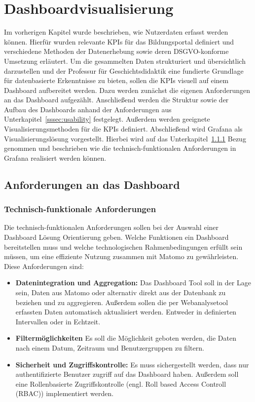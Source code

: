 \chapter{Dashboardvisualisierung} %
\label{ch:auswahl}
Im vorherigen Kapitel wurde beschrieben, wie Nutzerdaten erfasst werden können. Hierfür wurden relevante KPIs für das Bildungsportal definiert und verschiedene Methoden der Datenerhebung sowie deren DSGVO-konforme Umsetzung erläutert. Um die gesammelten Daten strukturiert und übersichtlich darzustellen und der Professur für Geschichtsdidaktik eine fundierte Grundlage für datenbasierte Erkenntnisse zu bieten, sollen die KPIs visuell auf einem Dashboard aufbereitet werden. Dazu werden zunächst die eigenen Anforderungen an das Dashboard aufgezählt. Anschließend werden die Struktur sowie der Aufbau des Dashboards anhand der Anforderungen aus Unterkapitel~\ref{sssec:usability} festgelegt. Außerdem werden geeignete Visualisierungsmethoden für die KPIs definiert. Abschließend wird Grafana als Visualisierungslösung vorgestellt. Hierbei wird auf das Unterkapitel~\ref{sssec:technfunk} Bezug genommen und beschrieben wie die technisch-funktionalen Anforderungen in Grafana realisiert werden können.

\section{Anforderungen an das Dashboard}
\label{sec:anforderungen}
\subsection{Technisch-funktionale Anforderungen}
\label{sssec:technfunk}
Die technisch-funktionalen Anforderungen sollen bei der Auswahl einer Dashboard Lösung Orientierung geben. Welche Funktionen ein Dashboard bereitstellen muss und welche technologischen Rahmenbedingungen erfüllt sein müssen, um eine effiziente Nutzung zusammen mit Matomo zu gewährleisten. Diese Anforderungen sind: 
\begin{itemize}
    \item \textbf{Datenintegration und Aggregation:} Das Dashboard Tool soll in der Lage sein, Daten aus Matomo oder alternativ direkt aus der Datenbank zu beziehen und zu aggregieren. Außerdem sollen die per Webanalysetool erfassten Daten automatisch aktualisiert werden. Entweder in definierten Intervallen oder in Echtzeit.
    \item \textbf{Filtermöglichkeiten} Es soll die Möglichkeit geboten werden, die Daten nach einem Datum, Zeitraum und Benutzergruppen zu filtern.
    \item \textbf{Sicherheit und Zugriffskontrolle:} Es muss sichergestellt werden, dass nur authentifizierte Benutzer zugriff auf das Dashboard haben. Außerdem soll eine Rollenbasierte Zugriffskontrolle (engl. Roll based Access Controll (RBAC)) implementiert werden.
\end{itemize}

